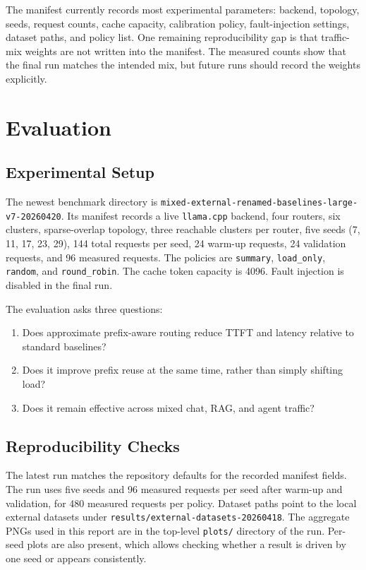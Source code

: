 \documentclass[10pt,twocolumn]{article}
\newcommand{\runpath}{\texttt{mixed-\allowbreak{}external-\allowbreak{}renamed-\allowbreak{}baselines-\allowbreak{}large-v7-\allowbreak{}20260420}}
\begin{document}
The manifest currently records most experimental parameters: backend, topology, seeds, request counts, cache capacity, calibration policy, fault-injection settings, dataset paths, and policy list. One remaining reproducibility gap is that traffic-mix weights are not written into the manifest. The measured counts show that the final run matches the intended mix, but future runs should record the weights explicitly.

\section{Evaluation}

\subsection{Experimental Setup}

The newest benchmark directory is \runpath. Its manifest records a live \texttt{llama.cpp} backend, four routers, six clusters, sparse-overlap topology, three reachable clusters per router, five seeds (7, 11, 17, 23, 29), 144 total requests per seed, 24 warm-up requests, 24 validation requests, and 96 measured requests. The policies are \texttt{summary}, \texttt{load\_only}, \texttt{random}, and \texttt{round\_robin}. The cache token capacity is 4096. Fault injection is disabled in the final run.

The evaluation asks three questions:

\begin{enumerate}[leftmargin=*]
\item Does approximate prefix-aware routing reduce TTFT and latency relative to standard baselines?
\item Does it improve prefix reuse at the same time, rather than simply shifting load?
\item Does it remain effective across mixed chat, RAG, and agent traffic?
\end{enumerate}

\subsection{Reproducibility Checks}

The latest run matches the repository defaults for the recorded manifest fields. The run uses five seeds and 96 measured requests per seed after warm-up and validation, for 480 measured requests per policy. Dataset paths point to the local external datasets under \texttt{results/external-datasets-20260418}. The aggregate PNGs used in this report are in the top-level \texttt{plots/} directory of the run. Per-seed plots are also present, which allows checking whether a result is driven by one seed or appears consistently.
\end{document}
